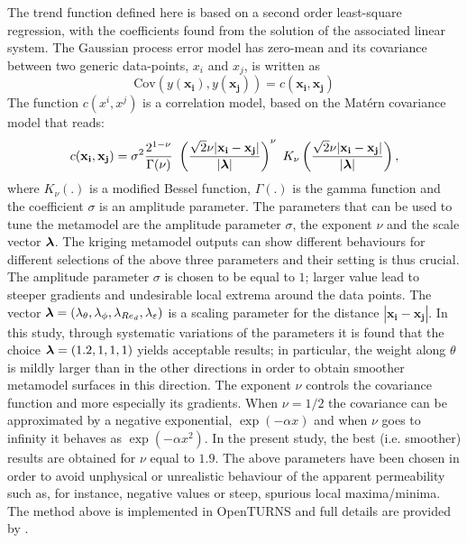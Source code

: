 The trend function defined  here is  based on a second order least-square regression, with the coefficients found from 
the solution of the associated linear system.
The Gaussian process error model has zero-mean and its covariance between two generic data-points, $x_i$ and $x_j$, is written as 
$$
\textrm{Cov}(y(\mathbf{x_i}), y(\mathbf{x_j})) = c(\mathbf{x_i}, \mathbf{x_j})
$$
The function $c(x^i, x^j)$ is a correlation model, based on the Mat\'ern covariance model that reads:
\begin{equation}
c(\mathbf{x_i}, \mathbf{x_j}) = \sigma^2 \dfrac{2^{1- \nu}}{\Gamma(\nu)} \  \left( \dfrac{\sqrt{2} \nu |\mathbf{x_i} - \mathbf{x_j}|}{|\bs{\lambda}|} \right)^{\nu} \ K_{\nu}\left( \dfrac{\sqrt{2} \nu |\mathbf{x_i} - \mathbf{x_j}|}{|\bs{\lambda}|} \right),
\label{eq:matern}
\end{equation}
where $K_{\nu}(.)$ is a modified Bessel function, $\Gamma(.)$ is the gamma function and the coefficient $\sigma$ is an amplitude parameter.
The parameters that can be used to tune the metamodel are the amplitude parameter $\sigma$, the exponent $\nu$ and the scale vector $\boldsymbol{\lambda}$.
The kriging metamodel outputs can show different behaviours for different selections of the above three parameters and their setting is thus crucial. 
The amplitude parameter $\sigma$ is chosen to be equal to $1$; larger value lead to steeper gradients and undesirable local extrema around the data points.
The vector $\boldsymbol{\lambda}=(\lambda_{\theta}, \lambda_{\phi}, \lambda_{Re_d}, \lambda_{\varepsilon} )$ is a scaling parameter for the distance $ |\mathbf{x_i} - \mathbf{x_j}|$.
In this study, through systematic variations of the parameters it is found that  the choice $\boldsymbol{\lambda}=(1.2, 1, 1, 1)$ yields acceptable results; in particular, the weight along $\theta$ 
is mildly larger than in the other directions in order to obtain smoother metamodel surfaces in this direction.
The exponent $\nu$ controls the  covariance function and more especially its gradients. 
When  $\nu = 1/2$ the covariance can be approximated by a negative exponential, $\exp(-\alpha x)$  and  when $\nu$ goes to infinity it behaves as $\exp(-\alpha x^2)$.
In the present study, the best (i.e. smoother) results are obtained for $\nu$ equal to $1.9$.
The above parameters have been chosen in order to avoid unphysical or unrealistic  behaviour of the apparent permeability such as, for instance,  negative values or 
steep, spurious local maxima/minima.
The method above is implemented in OpenTURNS and full details are provided by \citet{openturns}. 


